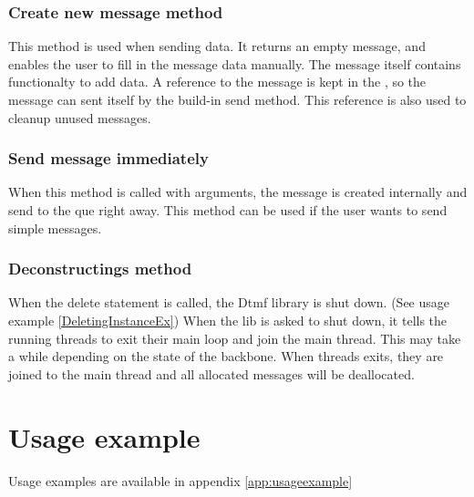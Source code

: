\subsubsection{Create new message method}
This method is used when sending data. It returns an empty message, and enables the user to fill in the message data manually. The message itself contains functionalty to add data. A reference to the message is kept in the , so the message can sent itself by the build-in send method. This reference is also used to cleanup unused messages.

\subsubsection{Send message immediately}
When this method is called with arguments, the message is created internally and send to the que right away. This method can be used if the user wants to send simple messages.

\subsubsection{Deconstructings method}
When the delete statement is called, the Dtmf library is shut down. (See usage example \ref{DeletingInstanceEx}) When the lib is asked to shut down, it tells the running threads to exit their main loop and join the main thread. This may take a while depending on the state of the backbone. When threads exits, they are joined to the main thread and all allocated messages will be deallocated.

\section{Usage example}
Usage examples are available in appendix \ref{app:usageexample}





